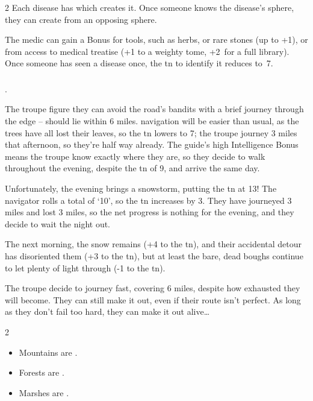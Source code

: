 \begin{multicols}{2}
%
Each disease has  which creates it.
Once someone knows the disease's \gls{sphere}, they can create  from an opposing \gls{sphere}.

The medic can gain a Bonus for tools, such as herbs, or rare stones (up to +1), or from access to medical treatise (+1 to a weighty tome, +2~for a full library).
Once someone has seen a disease once, the \gls{tn} to identify it reduces to~7.

\subsubsection{}
\label{navigate_land}
.

\begin{exampletext}
  The troupe figure they can avoid the road's bandits with a brief journey through the \gls{edge} --  should lie within 6 miles.
  \Gls{navigation} will be easier than usual, as the trees have all lost their leaves, so the \gls{tn} lowers to 7; the troupe journey 3 miles that afternoon, so they're half way already.
  The guide's high Intelligence Bonus means the troupe know exactly where they are, so they decide to walk throughout the evening, despite the \gls{tn} of 9, and arrive the same day.

  Unfortunately, the evening brings a snowstorm, putting the \gls{tn} at 13!
  The navigator rolls a total of `10', so the \gls{tn} increases by 3.
  They have journeyed 3 miles and lost 3 miles, so the net progress is nothing for the evening, and they decide to wait the night out.

  The next morning, the snow remains (+4 to the \gls{tn}), and their accidental detour has disoriented them (+3 to the \gls{tn}), but at least the bare, dead boughs continue to let plenty of light through (-1 to the \gls{tn}).

  The troupe decide to journey fast, covering 6 miles, despite how exhausted they will become.
  They can still make it out, even if their route isn't perfect.
  As long as they don't fail too hard, they can make it out alive\ldots
\end{exampletext}

\begin{multicols}{2}
\begin{itemize}
  \item
    Mountains are \tn[8].
  \item
    Forests are \tn[11].
  \item
    Marshes are \tn[12].
\end{itemize}


\end{multicols}
\end{multicols}
